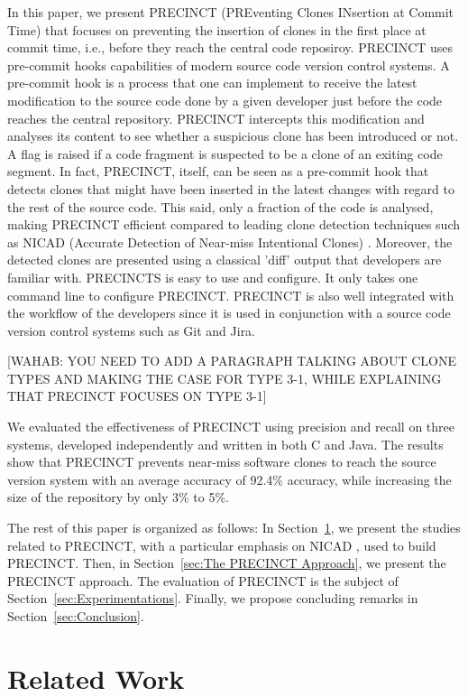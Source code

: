 \documentclass[conference]{IEEEtran}
\begin{document}
In this paper, we present PRECINCT (PREventing Clones INsertion at Commit Time) that focuses on preventing the insertion of clones in the first place at commit time, i.e., before they reach the central code reposiroy. PRECINCT uses pre-commit hooks capabilities of modern source code version control systems. A pre-commit hook is a process that one can implement to receive the latest modification to the source code done by a given developer just before the code reaches the central repository.
PRECINCT intercepts this modification and analyses its  content to see whether a suspicious clone has been introduced or not.
A flag is raised if a code fragment is suspected to be a clone of an exiting code segment.
In fact, PRECINCT, itself, can be seen as a pre-commit hook that detects clones that might have been inserted in the latest changes with regard to the rest of the source code.
This said, only a fraction of the code is analysed, making PRECINCT efficient compared to leading  clone detection techniques such as NICAD (Accurate Detection of Near-miss Intentional Clones) \cite{Cordy2011}.
Moreover, the detected clones are presented using a classical 'diff' output that developers are familiar with.  PRECINCTS is easy to use and configure. It only takes  one command line to configure PRECINCT.
PRECINCT is also well integrated with the workflow of the developers since it is used in conjunction with a source code version control systems such as Git and Jira.

[WAHAB: YOU NEED TO ADD A PARAGRAPH TALKING ABOUT CLONE TYPES AND MAKING THE CASE FOR TYPE 3-1, WHILE EXPLAINING THAT PRECINCT FOCUSES ON TYPE 3-1]

We evaluated the effectiveness of PRECINCT using precision and recall on three systems, developed independently and written in both C and Java. The results show that PRECINCT prevents near-miss software clones to reach the source version system with an average accuracy of 92.4\% accuracy, while increasing the size of the repository by only 3\% to 5\%. 

The rest of this paper is organized as follows: In Section~\ref{sec:Related Work}, we present the studies related to PRECINCT, with a particular emphasis on NICAD \cite{Cordy2011}, used to build PRECINCT. Then, in Section~\ref{sec:The PRECINCT Approach}, we present the PRECINCT approach. The evaluation of PRECINCT is the subject of  Section~\ref{sec:Experimentations}.
Finally, we propose concluding remarks in Section~\ref{sec:Conclusion}.

\section{Related Work}
\label{sec:Related Work}
\end{document}
